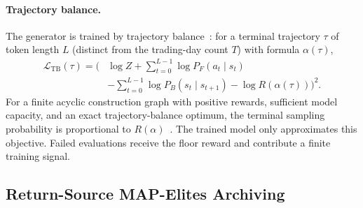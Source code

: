 \paragraph{Trajectory balance.} The generator is trained by trajectory balance~\cite{malkin2022trajectorybalance,bengio2021gflownet}: for a terminal trajectory $\tau$ of token length $L$ (distinct from the trading-day count $T$) with formula $\alpha(\tau)$,
\begin{equation}
\label{eq:alphaqd_tb}
\begin{aligned}
\mathcal{L}_{\mathrm{TB}}(\tau)
=\Biggl(&\log Z+\sum_{t=0}^{L-1}\log P_F(a_t\mid s_t)\\[-0.2em]
&-\sum_{t=0}^{L-1}\log P_B(s_t\mid s_{t+1})
-\log R(\alpha(\tau))\Biggr)^2.
\end{aligned}
\end{equation}
For a finite acyclic construction graph with positive rewards, sufficient model capacity, and an exact trajectory-balance optimum, the terminal sampling probability is proportional to $R(\alpha)$~\cite{bengio2021gflownet}. The trained model only approximates this objective. Failed evaluations receive the floor reward and contribute a finite training signal.

\subsection{Return-Source MAP-Elites Archiving}
\label{sec:alphaqd_archive}

